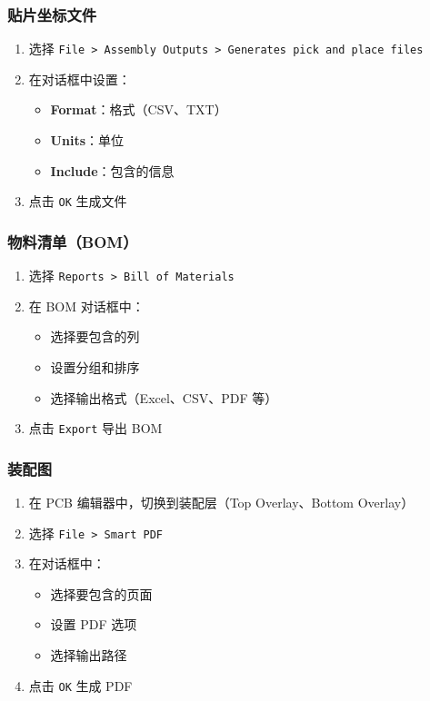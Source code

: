\subsubsection{贴片坐标文件}


\begin{enumerate}
  \item 选择 \lstinline{File > Assembly Outputs > Generates pick and place files}
  \item 在对话框中设置：
    \begin{itemize}
      \item \textbf{Format}：格式（CSV、TXT）
      \item \textbf{Units}：单位
      \item \textbf{Include}：包含的信息
    \end{itemize}
  \item 点击 \lstinline{OK} 生成文件
\end{enumerate}

\subsubsection{物料清单（BOM）}


\begin{enumerate}
  \item 选择 \lstinline{Reports > Bill of Materials}
  \item 在 BOM 对话框中：
    \begin{itemize}
      \item 选择要包含的列
      \item 设置分组和排序
      \item 选择输出格式（Excel、CSV、PDF 等）
    \end{itemize}
  \item 点击 \lstinline{Export} 导出 BOM
\end{enumerate}

\subsubsection{装配图}


\begin{enumerate}
  \item 在 PCB 编辑器中，切换到装配层（Top Overlay、Bottom Overlay）
  \item 选择 \lstinline{File > Smart PDF}
  \item 在对话框中：
    \begin{itemize}
      \item 选择要包含的页面
      \item 设置 PDF 选项
      \item 选择输出路径
    \end{itemize}
  \item 点击 \lstinline{OK} 生成 PDF
\end{enumerate}

